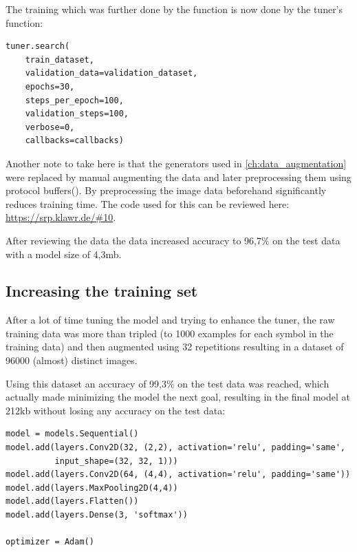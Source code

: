 The training which was further done by the  function is now done by the tuner's  function:

\begin{lstlisting}
tuner.search(
    train_dataset,
    validation_data=validation_dataset,
    epochs=30,
    steps_per_epoch=100,
    validation_steps=100,
    verbose=0,
    callbacks=callbacks)
\end{lstlisting}

Another note to take here is that the generators used in \ref{ch:data_augmentation} were replaced by manual augmenting the data and later preprocessing them using protocol buffers().
By preprocessing the image data beforehand significantly reduces training time.
The code used for this can be reviewed here: \url{https://srp.klawr.de/\#10}.

After reviewing the data the data increased accuracy to 96,7\% on the test data with a model size of 4,3mb.

\subsection{Increasing the training set}

After a lot of time tuning the model and trying to enhance the tuner, the raw training data was more than tripled (to 1000 examples for each symbol in the training data) and then augmented using 32 repetitions resulting in a dataset of 96000 (almost) distinct images.

Using this dataset an accuracy of 99,3\% on the test data was reached, which actually made minimizing the model the next goal, resulting in the final model at 212kb without losing any accuracy on the test data:


\begin{lstlisting}
model = models.Sequential()
model.add(layers.Conv2D(32, (2,2), activation='relu', padding='same',
          input_shape=(32, 32, 1)))
model.add(layers.Conv2D(64, (4,4), activation='relu', padding='same'))
model.add(layers.MaxPooling2D(4,4))
model.add(layers.Flatten())
model.add(layers.Dense(3, 'softmax'))

optimizer = Adam()
\end{lstlisting}